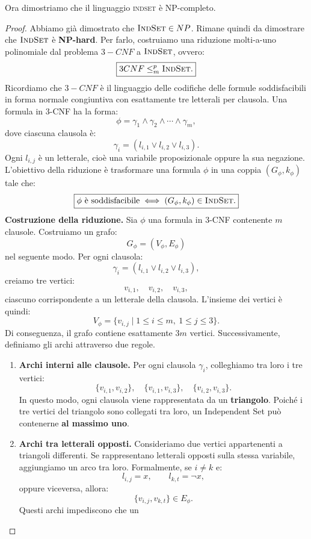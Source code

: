 \noindent Ora dimostriamo che il linguaggio \textsc{indset} è NP-completo.
\begin{proof}
Abbiamo già dimostrato che $\textsc{IndSet}\in NP$. Rimane quindi da dimostrare che $\textsc{IndSet}$ è \textbf{NP-hard}.
Per farlo, costruiamo una riduzione molti-a-uno polinomiale dal problema $3-CNF$ a $\textsc{IndSet}$, ovvero:
\[
\boxed{3CNF\leq_m^p \textsc{IndSet}.}
\]
Ricordiamo che $3-CNF$ è il linguaggio delle codifiche delle formule soddisfacibili
in forma normale congiuntiva con esattamente tre letterali per clausola.
Una formula in $3$-CNF ha la forma:
\[
\phi=\gamma_1\land\gamma_2\land
\cdots\land\gamma_m,
\]
dove ciascuna clausola è:
\[
\gamma_i=
(l_{i,1}\lor l_{i,2}\lor l_{i,3}).
\]
Ogni $l_{i,j}$ è un letterale, cioè una variabile proposizionale oppure la sua negazione.
L'obiettivo della riduzione è trasformare una formula $\phi$ in una coppia
$(G_\phi,k_\phi)$ tale che:
\[
\boxed{
\phi\text{ è soddisfacibile}
\iff
(G_\phi,k_\phi)\in \textsc{IndSet}.
}
\]
\smallskip
\noindent
\textbf{Costruzione della riduzione.}
Sia $\phi$ una formula in $3$-CNF
contenente $m$ clausole.
Costruiamo un grafo:
\[
G_\phi=(V_\phi,E_\phi)
\]
nel seguente modo.
Per ogni clausola:
\[
\gamma_i=
(l_{i,1}\lor l_{i,2}\lor l_{i,3}),
\]
creiamo tre vertici:
\[
v_{i,1},\quad v_{i,2},\quad v_{i,3},
\]
ciascuno corrispondente a un letterale
della clausola.
L'insieme dei vertici è quindi:
\[
\boxed{
V_\phi=
\{v_{i,j}\mid
1\leq i\leq m,\ 1\leq j\leq3\}.
}
\]
Di conseguenza, il grafo contiene
esattamente $3m$ vertici.
Successivamente, definiamo gli archi
attraverso due regole.
\begin{enumerate}
    \item \textbf{Archi interni alle clausole.}
    Per ogni clausola $\gamma_i$,
    colleghiamo tra loro i tre vertici:
    \[
    \{v_{i,1},v_{i,2}\},\quad
    \{v_{i,1},v_{i,3}\},\quad
    \{v_{i,2},v_{i,3}\}.
    \]
    In questo modo, ogni clausola viene
    rappresentata da un \textbf{triangolo}.
    Poiché i tre vertici del triangolo
    sono collegati tra loro, un Independent Set
    può contenerne \textbf{al massimo uno}.
    \item \textbf{Archi tra letterali opposti.}
    Consideriamo due vertici appartenenti
    a triangoli differenti.
    Se rappresentano letterali opposti
    sulla stessa variabile, aggiungiamo
    un arco tra loro.
    Formalmente, se $i\neq k$ e:
    \[
    l_{i,j}=x,\qquad l_{k,t}=\neg x,
    \]
    oppure viceversa, allora:
    \[
    \{v_{i,j},v_{k,t}\}\in E_\phi.
    \]
    Questi archi impediscono che un

\end{enumerate}
\end{proof}
